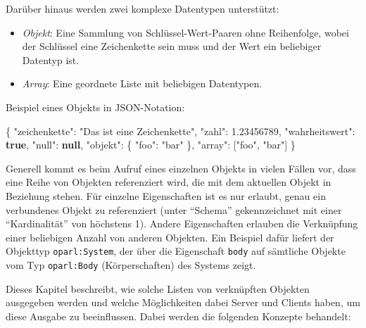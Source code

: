 \documentclass[,a4paper]{article}
\newenvironment{Shaded}{}{}
\newcommand{\KeywordTok}[1]{\textcolor[rgb]{0.00,0.44,0.13}{\textbf{{#1}}}}
\newcommand{\DataTypeTok}[1]{\textcolor[rgb]{0.56,0.13,0.00}{{#1}}}
\newcommand{\FloatTok}[1]{\textcolor[rgb]{0.25,0.63,0.44}{{#1}}}
\newcommand{\StringTok}[1]{\textcolor[rgb]{0.25,0.44,0.63}{{#1}}}
\newcommand{\OtherTok}[1]{\textcolor[rgb]{0.00,0.44,0.13}{{#1}}}
\newcommand{\FunctionTok}[1]{\textcolor[rgb]{0.02,0.16,0.49}{{#1}}}
\begin{document}
Darüber hinaus werden zwei komplexe Datentypen unterstützt:

\begin{itemize}
\itemsep1pt\parskip0pt
\item
  \emph{Objekt}: Eine Sammlung von Schlüssel-Wert-Paaren ohne
  Reihenfolge, wobei der Schlüssel eine Zeichenkette sein muss und der
  Wert ein beliebiger Datentyp ist.
\item
  \emph{Array}: Eine geordnete Liste mit beliebigen Datentypen.
\end{itemize}

Beispiel eines Objekts in JSON-Notation:

\begin{Shaded}
\begin{Highlighting}[]
\FunctionTok{\{}
    \DataTypeTok{"zeichenkette"}\FunctionTok{:} \StringTok{"Das ist eine Zeichenkette"}\FunctionTok{,}
    \DataTypeTok{"zahl"}\FunctionTok{:} \FloatTok{1.23456789}\FunctionTok{,}
    \DataTypeTok{"wahrheitswert"}\FunctionTok{:} \KeywordTok{true}\FunctionTok{,}
    \DataTypeTok{"null"}\FunctionTok{:} \KeywordTok{null}\FunctionTok{,}
    \DataTypeTok{"objekt"}\FunctionTok{:} \FunctionTok{\{}
        \DataTypeTok{"foo"}\FunctionTok{:} \StringTok{"bar"}
    \FunctionTok{\},}
    \DataTypeTok{"array"}\FunctionTok{:} \OtherTok{[}\StringTok{"foo"}\OtherTok{,} \StringTok{"bar"}\OtherTok{]}
\FunctionTok{\}}
\end{Highlighting}
\end{Shaded}


Generell kommt es beim Aufruf eines einzelnen Objekts in vielen Fällen
vor, dass eine Reihe von Objekten referenziert wird, die mit dem
aktuellen Objekt in Beziehung stehen. Für einzelne Eigenschaften ist es
nur erlaubt, genau ein verbundenes Objekt zu referenziert (unter
``Schema'' gekennzeichnet mit einer ``Kardinalität'' von höchstens 1).
Andere Eigenschaften erlauben die Verknüpfung einer beliebigen Anzahl
von anderen Objekten. Ein Beispiel dafür liefert der Objekttyp
\texttt{oparl:System}, der über die Eigenschaft \texttt{body} auf
sämtliche Objekte vom Typ \texttt{oparl:Body} (Körperschaften) des
Systems zeigt.

Dieses Kapitel beschreibt, wie solche Listen von verknüpften Objekten
ausgegeben werden und welche Möglichkeiten dabei Server und Clients
haben, um diese Ausgabe zu beeinflussen. Dabei werden die folgenden
Konzepte behandelt:
\end{document}

